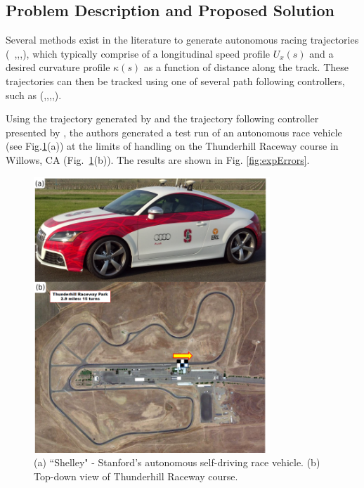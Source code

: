 \documentclass[9pt,shortpaper,twoside,web]{ieeecolor}
\begin{document}
\subsection{Problem Description and Proposed Solution}
Several methods exist in the literature to generate autonomous racing trajectories (~\cite{casanova},\cite{kelly},\cite{theodosis},\cite{kapaniadscc}), which typically comprise of a longitudinal speed profile $U_x(s)$ and a desired curvature profile $\kappa(s)$ as a function of distance along the track. These trajectories can then be tracked using one of several path following controllers, such as (\cite{mickcop},\cite{fricStudy},\cite{mickgeneral},\cite{shladover},\cite{nagai}). 

Using the trajectory generated by \cite{kapaniadscc} and the trajectory following controller presented by \cite{kapania}, the
authors generated a test run of an autonomous race vehicle (see Fig.\ref{fig:carpic}(a)) at the limits of handling on the Thunderhill Raceway course in Willows, CA (Fig.~\ref{fig:carpic}(b)). The results are shown in Fig. \ref{fig:expErrors}.

\begin{figure}[h]
\centering
\includegraphics[width=3.5in]{figures/pic1.png}
\caption{(a) ``Shelley" - Stanford's autonomous self-driving race vehicle. (b) Top-down view of Thunderhill Raceway course. }
\label{fig:carpic}
\end{figure}
\end{document}
